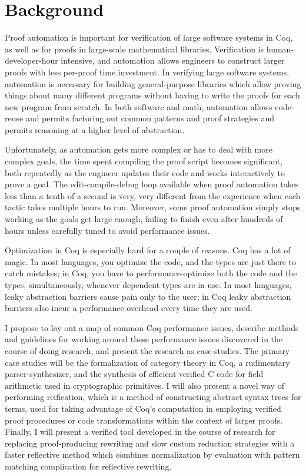 \documentclass[twoside]{article}
\begin{document}
\section{Background}

Proof automation is important for verification of large software systems in Coq, as well as for proofs in large-scale mathematical libraries.
Verification is human-developer-hour intensive, and automation allows engineers to construct larger proofs with less per-proof time investment.
In verifying large software systems, automation is necessary for building general-purpose libraries which allow proving things about many different programs without having to write the proofs for each new program from scratch.
In both software and math, automation allows code-reuse and permits factoring out common patterns and proof strategies and permits reasoning at a higher level of abstraction.

Unfortunately, as automation gets more complex or has to deal with more complex goals, the time spent compiling the proof script becomes significant, both repeatedly as the engineer updates their code and works interactively to prove a goal.
The edit-compile-debug loop available when proof automation takes less than a tenth of a second is very, very different from the experience when each tactic takes multiple hours to run.
Moreover, some proof automation simply stops working as the goals get large enough, failing to finish even after hundreds of hours unless carefully tuned to avoid performance issues.

Optimization in Coq is especially hard for a couple of reasons.
Coq has a lot of magic.
In most languages, you optimize the code, and the types are just there to catch mistakes;
in Coq, you have to performance-optimize both the code and the types, simultaneously, whenever dependent types are in use.
In most languages, leaky abstraction barriers cause pain only to the user;
in Coq leaky abstraction barriers also incur a performance overhead every time they are used.

I propose to lay out a map of common Coq performance issues, describe methods and guidelines for working around these performance issues discovered in the course of doing research, and present the research as case-studies.
The primary case studies will be the formalization of category theory in Coq, a rudimentary parser-synthesizer, and the synthesis of efficient verified C code for field arithmetic used in cryptographic primitives.
I will also present a novel way of performing reification, which is a method of constructing abstract syntax trees for terms, used for taking advantage of Coq's computation in employing verified proof procedures or code transformations within the context of larger proofs.
Finally, I will present a verified tool developed in the course of research for replacing proof-producing rewriting and slow custom reduction strategies with a faster reflective method which combines normalization by evaluation with pattern matching complication for reflective rewriting.
\end{document}
